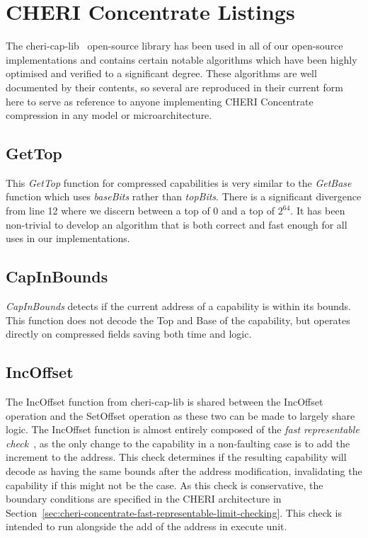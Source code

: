 \chapter{CHERI Concentrate Listings}
\label{app:cheri-128-listings}

The cheri-cap-lib~\cite{CHERI-cheri-cap-lib} open-source library has been used in all of our open-source~\cite{CHERI-cheri-cpu,CHERI-Piccolo,CHERI-Flute,CHERI-Toooba} implementations and contains certain notable algorithms which have been highly optimised and verified to a significant degree.
These algorithms are well documented by their contents, so several are reproduced in their current form here to serve as reference to anyone implementing CHERI Concentrate compression in any model or microarchitecture.

\section{GetTop}
\label{sec:cheri-128-listings-gettop}

This \emph{GetTop} function for compressed capabilities is very similar to the \emph{GetBase} function which uses \emph{baseBits} rather than \emph{topBits}.
There is a significant divergence from line 12 where we discern between a top of 0 and a top of $2^{64}$.
It has been non-trivial to develop an algorithm that is both correct and fast enough for all uses in our implementations.



\section{CapInBounds}
\label{sec:cheri-128-listings-capinbounds}

\emph{CapInBounds} detects if the current address of a capability is within its bounds.
This function does not decode the Top and Base of the capability,
but operates directly on compressed fields saving both time and logic.



\section{IncOffset}
\label{sec:cheri-128-listings-incoffset}

The IncOffset function from cheri-cap-lib is shared between the IncOffset operation and the SetOffset operation as these two can be made to largely share logic.
The IncOffset function is almost entirely composed of the \emph{fast representable check}~\cite{Woodruff2019}, as the only change to the capability in a non-faulting case is to add the increment to the address.
This check determines if the resulting capability will decode as having the same bounds after the address modification, invalidating the capability if this might not be the case.
As this check is conservative, the boundary conditions are specified in the CHERI architecture in Section~\ref{sec:cheri-concentrate-fast-representable-limit-checking}.
This check is intended to run alongside the add of the address in execute unit.

